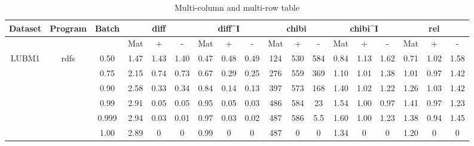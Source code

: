 \documentclass[sigconf,screen,review,natbib]{acmart}
\theoremstyle{definition}
\begin{document}
\begin{table}[!ht]
	\caption{Multi-column and multi-row table}
	\begin{center}
		\begin{tabular}{|c|c|c|c|c|c|c|c|c|c|c|c|c|c|c|c|c|c|}
			Dataset & Program                 & Batch & \multicolumn{3}{c|}{diff} & \multicolumn{3}{c|}{diff^{I}} & \multicolumn{3}{c|}{chibi} & \multicolumn{3}{c|}{chibi^{I}} & \multicolumn{3}{c|}{rel}                                                                       \\
			\hline
			        &                         &       & Mat                       & +                             & -                          & Mat                            & +                        & -    & Mat  & +    & -    & Mat  & +    & -    & Mat  & +    & -    \\
			\hline
			LUBM1   & \multirow{6}{*}{rdfs}   & 0.50  & 1.47                      & 1.43                          & 1.40                       & 0.47                           & 0.48                     & 0.49 & 124  & 530  & 584  & 0.84 & 1.13 & 1.62 & 0.71 & 1.02 & 1.58 \\
			        &                         & 0.75  & 2.15                      & 0.74                          & 0.73                       & 0.67                           & 0.29                     & 0.25 & 276  & 559  & 369  & 1.10 & 1.01 & 1.38 & 1.01 & 0.97 & 1.42 \\
			        &                         & 0.90  & 2.58                      & 0.33                          & 0.34                       & 0.84                           & 0.14                     & 0.13 & 397  & 573  & 168  & 1.40 & 1.02 & 1.22 & 1.26 & 1.03 & 1.42 \\
			        &                         & 0.99  & 2.91                      & 0.05                          & 0.05                       & 0.95                           & 0.05                     & 0.03 & 486  & 584  & 23   & 1.54 & 1.00 & 0.97 & 1.41 & 0.97 & 1.23 \\
			        &                         & 0.999 & 2.94                      & 0.03                          & 0.01                       & 0.97                           & 0.03                     & 0.02 & 487  & 586  & 5.5  & 1.60 & 1.00 & 1.23 & 1.38 & 0.94 & 1.45 \\
			        &                         & 1.00  & 2.89                      & 0                             & 0                          & 0.99                           & 0                        & 0    & 487  & 0    & 0    & 1.34 & 0    & 0    & 1.20 & 0    & 0    \\

\end{tabular}
\end{center}
\end{table}
\end{document}
